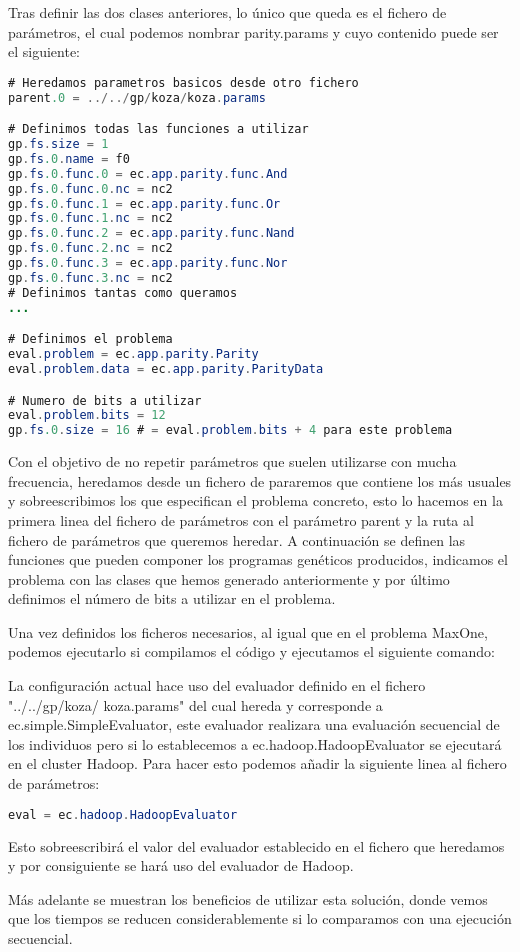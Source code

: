 Tras definir las dos clases anteriores, lo único que queda es el fichero de parámetros, el cual podemos nombrar parity.params y cuyo contenido puede ser el siguiente:

\begin{lstlisting}[language=Java]
# Heredamos parametros basicos desde otro fichero
parent.0 = ../../gp/koza/koza.params

# Definimos todas las funciones a utilizar
gp.fs.size = 1
gp.fs.0.name = f0
gp.fs.0.func.0 = ec.app.parity.func.And
gp.fs.0.func.0.nc = nc2
gp.fs.0.func.1 = ec.app.parity.func.Or
gp.fs.0.func.1.nc = nc2
gp.fs.0.func.2 = ec.app.parity.func.Nand
gp.fs.0.func.2.nc = nc2
gp.fs.0.func.3 = ec.app.parity.func.Nor
gp.fs.0.func.3.nc = nc2
# Definimos tantas como queramos
...

# Definimos el problema
eval.problem = ec.app.parity.Parity
eval.problem.data = ec.app.parity.ParityData

# Numero de bits a utilizar
eval.problem.bits = 12
gp.fs.0.size = 16 # = eval.problem.bits + 4 para este problema
\end{lstlisting}

Con el objetivo de no repetir parámetros que suelen utilizarse con mucha frecuencia, heredamos desde un fichero de pararemos que contiene los m\'as usuales y sobreescribimos los que especifican el problema concreto, esto lo hacemos en la primera linea del fichero de parámetros con el parámetro parent y la ruta al fichero de parámetros que queremos heredar. A continuación se definen las funciones que pueden componer los programas genéticos producidos, indicamos el problema con las clases que hemos generado anteriormente y por \'ultimo definimos el n\'umero de bits a utilizar en el problema.

Una vez definidos los ficheros necesarios, al igual que en el problema MaxOne, podemos ejecutarlo si compilamos el código y ejecutamos el siguiente comando:


La configuración actual hace uso del evaluador definido en el fichero "../../gp/koza/ koza.params" del cual hereda y corresponde a ec.simple.SimpleEvaluator, este evaluador realizara una evaluación secuencial de los individuos pero si lo establecemos a ec.hadoop.HadoopEvaluator se ejecutar\'a en el cluster Hadoop. Para hacer esto podemos a\~nadir la siguiente linea al fichero de parámetros:

\begin{lstlisting}[language=Java]
eval = ec.hadoop.HadoopEvaluator
\end{lstlisting}

Esto sobreescribir\'a el valor del evaluador establecido en el fichero que heredamos y por consiguiente se hará uso del evaluador de Hadoop.

M\'as adelante  se muestran los beneficios de utilizar esta solución, donde vemos que los tiempos se reducen considerablemente si lo comparamos con una ejecución secuencial.
